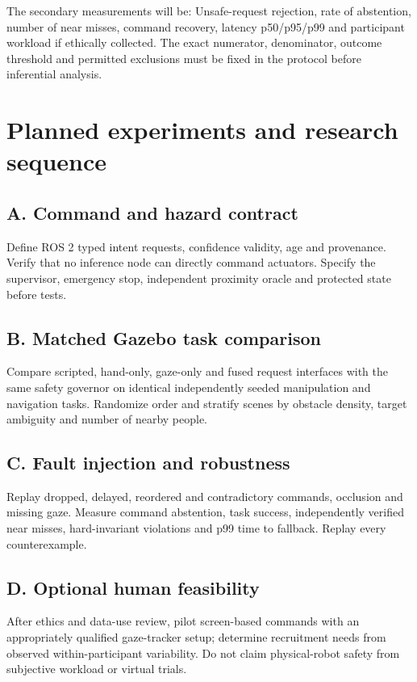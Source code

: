 \documentclass[11pt,a4paper]{article}
\begin{document}
The secondary measurements will be: Unsafe-request rejection, rate of abstention, number of near misses, command recovery, latency p50/p95/p99 and participant workload if ethically collected. The exact numerator, denominator, outcome threshold and permitted exclusions must be fixed in the protocol before inferential analysis.

\section{Planned experiments and research sequence}
\subsection{A. Command and hazard contract}
Define ROS 2 typed intent requests, confidence validity, age and provenance. Verify that no inference node can directly command actuators. Specify the supervisor, emergency stop, independent proximity oracle and protected state before tests.

\subsection{B. Matched Gazebo task comparison}
Compare scripted, hand-only, gaze-only and fused request interfaces with the same safety governor on identical independently seeded manipulation and navigation tasks. Randomize order and stratify scenes by obstacle density, target ambiguity and number of nearby people.

\subsection{C. Fault injection and robustness}
Replay dropped, delayed, reordered and contradictory commands, occlusion and missing gaze. Measure command abstention, task success, independently verified near misses, hard-invariant violations and p99 time to fallback. Replay every counterexample.

\subsection{D. Optional human feasibility}
After ethics and data-use review, pilot screen-based commands with an appropriately qualified gaze-tracker setup; determine recruitment needs from observed within-participant variability. Do not claim physical-robot safety from subjective workload or virtual trials.
\end{document}
